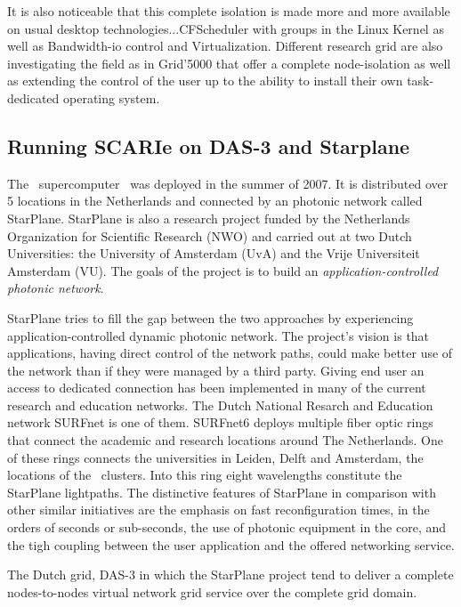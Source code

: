 It is also noticeable that this complete isolation is made more and 
more available on usual desktop technologies...CFScheduler with groups 
in the Linux Kernel as well as Bandwidth-io control and Virtualization.
Different research grid are also investigating the field as in 
Grid'5000 that offer a complete node-isolation as well as extending the 
control of the user up to the ability to install their own task-dedicated 
operating system. 

\subsection{Running SCARIe on DAS-3 and Starplane}
The \ supercomputer~\cite{das3} was deployed in the summer of
2007. It is distributed over 5 locations in the Netherlands and
connected by an photonic network called StarPlane. StarPlane is also a
research project funded by the Netherlands Organization for Scientific
Research (NWO) and carried out at two Dutch Universities: the
University of Amsterdam (UvA) and the Vrije Universiteit Amsterdam
(VU). The goals of the project is to build an
\textit{application-controlled photonic network}. 

StarPlane tries to fill the gap between the two
approaches by experiencing application-controlled dynamic photonic
network. The project's vision is that applications, having direct
control of the network paths, could make better use of the network
than if they were managed by a third party. Giving end user an access
to dedicated connection has been implemented in many of the current
research and education networks. The Dutch National Resarch and
Education network SURFnet is one of them. SURFnet6 deploys multiple
fiber optic rings that connect the academic and research locations
around The Netherlands. One of these rings connects the universities
in Leiden, Delft and Amsterdam, the locations of the \ clusters.
Into this ring eight wavelengths constitute the StarPlane lightpaths.
The distinctive features of StarPlane in comparison with other similar
initiatives are the emphasis on fast reconfiguration times, in the
orders of seconds or sub-seconds, the use of photonic equipment in the
core, and the tigh coupling between the user application and the
offered networking service.

The Dutch grid, DAS-3 in which the StarPlane project tend
to deliver a complete nodes-to-nodes virtual network grid service over the 
complete grid domain. 

